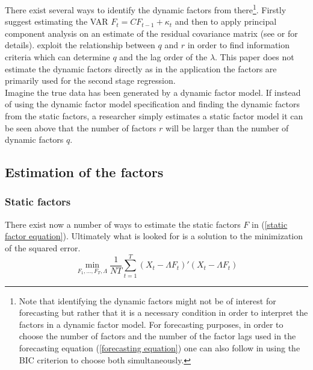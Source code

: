 \documentclass[12pt]{article}
\begin{document}
There exist several ways to identify the dynamic factors from there\footnote{Note that identifying the dynamic factors might not be of interest for forecasting but rather that it is a necessary condition in order to interpret the factors in a dynamic factor model. For forecasting purposes, in order to choose the number of factors and the number of the factor lags used in the forecasting equation (\ref{forecasting equation}) one can also follow \citet{bai2008forecasting} in using the BIC criterion to choose both simultaneously. }. Firstly \citet{giannone2002tracking} suggest estimating the VAR $F_t = C F_{t-1} + \kappa_t$ and then to apply principal component analysis on an estimate of the residual covariance matrix (see \citet{breitung2004identification} or \citet{giannone2002tracking} for details). \citet{breitung2004identification} exploit the relationship between $q$ and $r$ in order to find information criteria which can determine $q$ and the lag order of the $\lambda$. This paper does not estimate the dynamic factors directly as in the application the factors are primarily used for the second stage regression. \\

Imagine the true data has been generated by a dynamic factor model. If instead of using the dynamic factor model specification and finding the dynamic factors from the static factors, a researcher simply estimates a static factor model it can be seen above that the number of factors $r$ will be larger than the number of dynamic factors $q$.

\subsection{Estimation of the factors}
\subsubsection{Static factors}
There exist now a number of ways to estimate the static factors $F$ in (\ref{static factor equation}). Ultimately what is looked for is a solution to the minimization of the squared error.
\begin{equation}
	\label{factor equation minimization problem}
	\min_{F_1, ..., F_T, \Lambda} \frac{1}{NT} \sum_{t=1}^T (X_t - \Lambda F_t)'(X_t - \Lambda F_t)
\end{equation}
\end{document}
